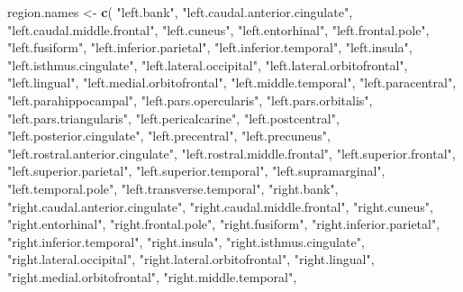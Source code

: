 \documentclass[
]{article}
\newenvironment{Shaded}{\begin{snugshade}}{\end{snugshade}}
\newcommand{\KeywordTok}[1]{\textcolor[rgb]{0.13,0.29,0.53}{\textbf{#1}}}
\newcommand{\NormalTok}[1]{#1}
\newcommand{\StringTok}[1]{\textcolor[rgb]{0.31,0.60,0.02}{#1}}
\begin{document}
\begin{Shaded}
\begin{Highlighting}[]
\NormalTok{region.names <-}\StringTok{ }\KeywordTok{c}\NormalTok{(}
  \StringTok{"left.bank"}\NormalTok{, }\StringTok{"left.caudal.anterior.cingulate"}\NormalTok{, }\StringTok{"left.caudal.middle.frontal"}\NormalTok{,}
  \StringTok{"left.cuneus"}\NormalTok{, }\StringTok{"left.entorhinal"}\NormalTok{, }\StringTok{"left.frontal.pole"}\NormalTok{, }\StringTok{"left.fusiform"}\NormalTok{,}
  \StringTok{"left.inferior.parietal"}\NormalTok{, }\StringTok{"left.inferior.temporal"}\NormalTok{, }\StringTok{"left.insula"}\NormalTok{,}
  \StringTok{"left.isthmus.cingulate"}\NormalTok{, }\StringTok{"left.lateral.occipital"}\NormalTok{, }\StringTok{"left.lateral.orbitofrontal"}\NormalTok{,}
  \StringTok{"left.lingual"}\NormalTok{, }\StringTok{"left.medial.orbitofrontal"}\NormalTok{, }\StringTok{"left.middle.temporal"}\NormalTok{,}
  \StringTok{"left.paracentral"}\NormalTok{, }\StringTok{"left.parahippocampal"}\NormalTok{,  }\StringTok{"left.pars.opercularis"}\NormalTok{,}
  \StringTok{"left.pars.orbitalis"}\NormalTok{, }\StringTok{"left.pars.triangularis"}\NormalTok{, }\StringTok{"left.pericalcarine"}\NormalTok{,}
  \StringTok{"left.postcentral"}\NormalTok{, }\StringTok{"left.posterior.cingulate"}\NormalTok{, }\StringTok{"left.precentral"}\NormalTok{,}
  \StringTok{"left.precuneus"}\NormalTok{, }\StringTok{"left.rostral.anterior.cingulate"}\NormalTok{, }\StringTok{"left.rostral.middle.frontal"}\NormalTok{,}
  \StringTok{"left.superior.frontal"}\NormalTok{, }\StringTok{"left.superior.parietal"}\NormalTok{, }\StringTok{"left.superior.temporal"}\NormalTok{,}
  \StringTok{"left.supramarginal"}\NormalTok{, }\StringTok{"left.temporal.pole"}\NormalTok{, }\StringTok{"left.transverse.temporal"}\NormalTok{,}
  \StringTok{"right.bank"}\NormalTok{, }\StringTok{"right.caudal.anterior.cingulate"}\NormalTok{, }\StringTok{"right.caudal.middle.frontal"}\NormalTok{,}
  \StringTok{"right.cuneus"}\NormalTok{, }\StringTok{"right.entorhinal"}\NormalTok{, }\StringTok{"right.frontal.pole"}\NormalTok{, }\StringTok{"right.fusiform"}\NormalTok{,}
  \StringTok{"right.inferior.parietal"}\NormalTok{, }\StringTok{"right.inferior.temporal"}\NormalTok{, }\StringTok{"right.insula"}\NormalTok{,}
  \StringTok{"right.isthmus.cingulate"}\NormalTok{, }\StringTok{"right.lateral.occipital"}\NormalTok{, }\StringTok{"right.lateral.orbitofrontal"}\NormalTok{,}
  \StringTok{"right.lingual"}\NormalTok{, }\StringTok{"right.medial.orbitofrontal"}\NormalTok{, }\StringTok{"right.middle.temporal"}\NormalTok{,}

\end{Highlighting}
\end{Shaded}
\end{document}
